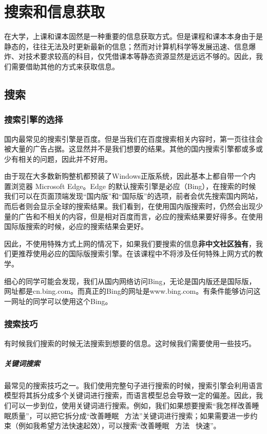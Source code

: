 \chapter{搜索和信息获取} %

在大学，上课和课本固然是一种重要的信息获取方式。但是课程和课本本身由于是静态的，往往无法及时更新最新的信息；然而对计算机科学等发展迅速、信息爆炸、对技术要求较高的科目，仅凭借课本等静态资源显然是远远不够的。因此，我们需要借助其他的方式来获取信息。

\section{搜索}

\subsection{搜索引擎的选择}

国内最常见的搜索引擎是百度。但是当我们在百度搜索相关内容时，第一页往往会被大量的广告占据。这显然并不是我们想要的结果。其他的国内搜索引擎都或多或少有相关的问题，因此并不好用。

由于现在大多数新购整机都预装了Windows正版系统，因此基本上都自带一个内置浏览器 Microsoft Edge。Edge 的默认搜索引擎是必应（Bing），在搜索的时候我们可以在页面顶端发现“国内版”和“国际版”的选项，前者会优先搜索国内网站，而后者则会显示全球的搜索结果。我们看到，在使用国内版搜索时，仍然会出现少量的广告和不相关的内容，但是相对百度而言，必应的搜索结果要好得多。在使用国际版搜索的时候，必应的搜索结果会更好。

因此，不使用特殊方式上网的情况下，如果我们要搜索的信息\textbf{非中文社区独有}，我们更推荐使用必应的国际版搜索引擎。在该课程中不将涉及任何特殊上网方式的教学。

\begin{note}
  细心的同学可能会发现，我们从国内网络访问Bing，无论是国内版还是国际版，网址都是cn.bing.com。而真正的Bing的网址是www.bing.com。有条件能够访问这一网址的同学可以使用这个Bing。
\end{note}

\subsection{搜索技巧}

有时候我们搜索的时候无法搜索到想要的信息。这时候我们需要使用一些技巧。

\paragraph{关键词搜索} 最常见的搜索技巧之一。我们使用完整句子进行搜索的时候，搜索引擎会利用语言模型将其拆分成多个关键词进行搜索，而语言模型总会导致一定的偏差。因此，我们可以一步到位，使用关键词进行搜索。例如，我们如果想要搜索“我怎样改善睡眠质量”，可以把它拆分成“改善睡眠 \ 方法”关键词进行搜索；如果需要进一步约束（例如我希望方法快速起效），可以搜索“改善睡眠 \ 方法 \ 快速”。

